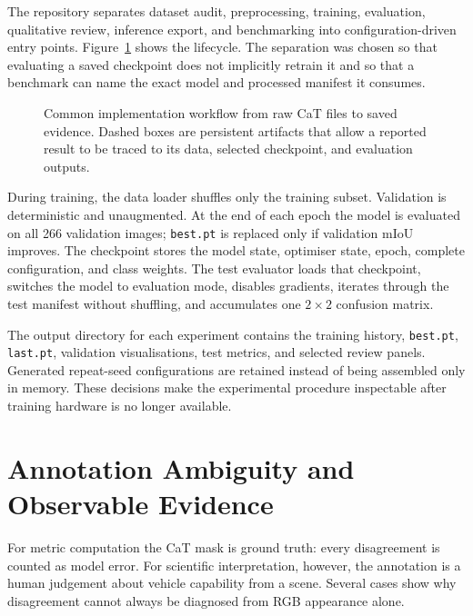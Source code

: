 The repository separates dataset audit, preprocessing, training, evaluation,
qualitative review, inference export, and benchmarking into configuration-driven
entry points. Figure~\ref{fig:common_pipeline} shows the lifecycle. The
separation was chosen so that evaluating a saved checkpoint does not
implicitly retrain it and so that a benchmark can name the exact model and
processed manifest it consumes.

\begin{figure}[H]
\centering
\resizebox{\textwidth}{!}{}
\caption[Common implementation workflow.]{Common implementation workflow from
raw CaT files to saved evidence. Dashed boxes are persistent artifacts that
allow a reported result to be traced to its data, selected checkpoint, and
evaluation outputs.}
\label{fig:common_pipeline}
\end{figure}

During training, the data loader shuffles only the training subset. Validation
is deterministic and unaugmented. At the end of each epoch the model is
evaluated on all 266 validation images; \texttt{best.pt} is replaced only if
validation mIoU improves. The checkpoint stores the model state, optimiser
state, epoch, complete configuration, and class weights. The test evaluator
loads that checkpoint, switches the model to evaluation mode, disables
gradients, iterates through the test manifest without shuffling, and
accumulates one $2\times2$ confusion matrix.

The output directory for each experiment contains the training history,
\texttt{best.pt}, \texttt{last.pt}, validation visualisations, test metrics,
and selected review panels. Generated repeat-seed configurations are retained
instead of being assembled only in memory. These decisions make the
experimental procedure inspectable after training hardware is no longer
available.

\section{Annotation Ambiguity and Observable Evidence}
\label{sec:annotation_ambiguity}

For metric computation the CaT mask is ground truth: every disagreement is
counted as model error. For scientific interpretation, however, the annotation
is a human judgement about vehicle capability from a scene. Several cases show
why disagreement cannot always be diagnosed from RGB appearance alone.

